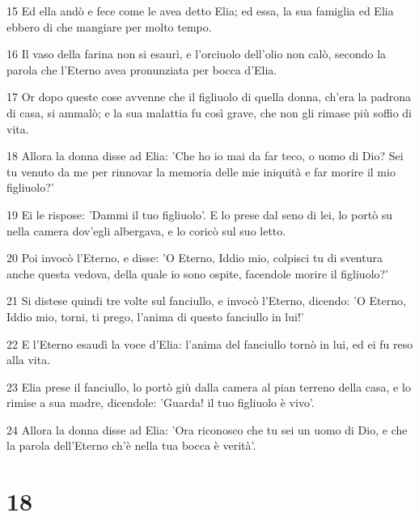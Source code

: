 \par 15 Ed ella andò e fece come le avea detto Elia; ed essa, la sua famiglia ed Elia ebbero di che mangiare per molto tempo.
\par 16 Il vaso della farina non si esaurì, e l'orciuolo dell'olio non calò, secondo la parola che l'Eterno avea pronunziata per bocca d'Elia.
\par 17 Or dopo queste cose avvenne che il figliuolo di quella donna, ch'era la padrona di casa, si ammalò; e la sua malattia fu così grave, che non gli rimase più soffio di vita.
\par 18 Allora la donna disse ad Elia: 'Che ho io mai da far teco, o uomo di Dio? Sei tu venuto da me per rinnovar la memoria delle mie iniquità e far morire il mio figliuolo?'
\par 19 Ei le rispose: 'Dammi il tuo figliuolo'. E lo prese dal seno di lei, lo portò su nella camera dov'egli albergava, e lo coricò sul suo letto.
\par 20 Poi invocò l'Eterno, e disse: 'O Eterno, Iddio mio, colpisci tu di sventura anche questa vedova, della quale io sono ospite, facendole morire il figliuolo?'
\par 21 Si distese quindi tre volte sul fanciullo, e invocò l'Eterno, dicendo: 'O Eterno, Iddio mio, torni, ti prego, l'anima di questo fanciullo in lui!'
\par 22 E l'Eterno esaudì la voce d'Elia: l'anima del fanciullo tornò in lui, ed ei fu reso alla vita.
\par 23 Elia prese il fanciullo, lo portò giù dalla camera al pian terreno della casa, e lo rimise a sua madre, dicendole: 'Guarda! il tuo figliuolo è vivo'.
\par 24 Allora la donna disse ad Elia: 'Ora riconosco che tu sei un uomo di Dio, e che la parola dell'Eterno ch'è nella tua bocca è verità'.

\chapter{18}

